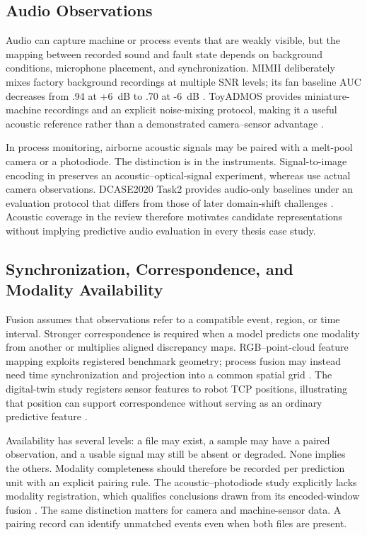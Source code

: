 \subsection{Audio Observations}

Audio can capture machine or process events that are weakly visible, but the mapping between recorded sound and fault state depends on background conditions, microphone placement, and synchronization. MIMII deliberately mixes factory background recordings at multiple SNR levels; its fan baseline AUC decreases from .94 at +6~dB to .70 at -6~dB \citep[Table~3]{Purohit2019MIMII}. ToyADMOS provides miniature-machine recordings and an explicit noise-mixing protocol, making it a useful acoustic reference rather than a demonstrated camera--sensor advantage \citep{Koizumi2019ToyADMOS}.

In process monitoring, airborne acoustic signals may be paired with a melt-pool camera or a photodiode. The distinction is in the instruments. Signal-to-image encoding in \citet{Li2022A} preserves an acoustic--optical-signal experiment, whereas \citet{Xie2025Audiovisual} use actual camera observations. DCASE2020 Task2 provides audio-only baselines under an evaluation protocol that differs from those of later domain-shift challenges \citep{Koizumi2020Description}. Acoustic coverage in the review therefore motivates candidate representations without implying predictive audio evaluation in every thesis case study.

\subsection{Synchronization, Correspondence, and Modality Availability}

Fusion assumes that observations refer to a compatible event, region, or time interval. Stronger correspondence is required when a model predicts one modality from another or multiplies aligned discrepancy maps. RGB--point-cloud feature mapping exploits registered benchmark geometry; process fusion may instead need time synchronization and projection into a common spatial grid \citep{Costanzino2024Multimodal,Petrich2021Multimodal}. The digital-twin study registers sensor features to robot TCP positions, illustrating that position can support correspondence without serving as an ordinary predictive feature \citep{Chen2023Multisensor}.

Availability has several levels: a file may exist, a sample may have a paired observation, and a usable signal may still be absent or degraded. None implies the others. Modality completeness should therefore be recorded per prediction unit with an explicit pairing rule. The acoustic--photodiode study explicitly lacks modality registration, which qualifies conclusions drawn from its encoded-window fusion \citep{Li2022A}. The same distinction matters for camera and machine-sensor data. A pairing record can identify unmatched events even when both files are present.

